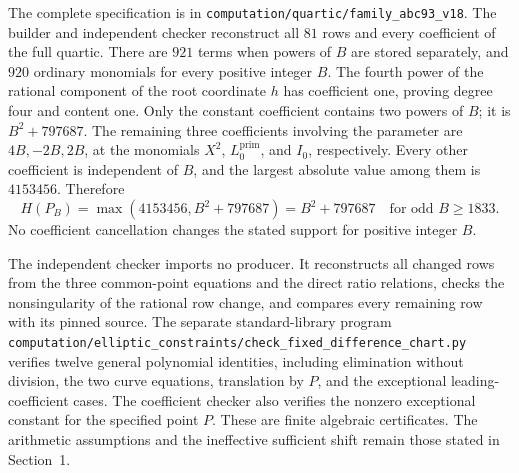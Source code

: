 \documentclass[11pt,a4paper]{article}
\begin{document}
The complete specification is in
\nolinkurl{computation/quartic/family_abc93_v18}. The builder and independent
checker reconstruct all $81$ rows and every coefficient of the full
quartic. There are $921$ terms when powers of $B$ are stored separately,
and $920$ ordinary monomials for every positive integer $B$.
The fourth power of the rational component of the root coordinate $h$
has coefficient one, proving degree four and content one.
Only the constant coefficient contains two powers of $B$; it is
$B^2+797687$. The remaining three coefficients involving the parameter
are $4B,-2B,2B$, at the monomials $X^2$, $L_0^{\mathrm{prim}}$,
and $I_0$, respectively. Every other coefficient is independent of $B$,
and the largest absolute value among them is $4153456$. Therefore
\[
 H(P_B)=\max(4153456,B^2+797687)
       =B^2+797687\quad\text{for odd }B\ge1833.
\]
No coefficient cancellation changes the stated support for positive integer $B$.

The independent checker imports no producer. It reconstructs all
changed rows from the three common-point equations and the direct ratio
relations, checks the nonsingularity of the rational row change, and
compares every remaining row with its pinned source. The separate
standard-library program
\nolinkurl{computation/elliptic_constraints/check_fixed_difference_chart.py}
verifies twelve general polynomial identities, including elimination
without division, the two curve equations, translation by $P$, and the
exceptional leading-coefficient cases. The coefficient checker also
verifies the nonzero exceptional constant for the specified point $P$.
These are finite algebraic certificates. The arithmetic assumptions and
the ineffective sufficient shift remain those stated in Section~1.
\end{document}
